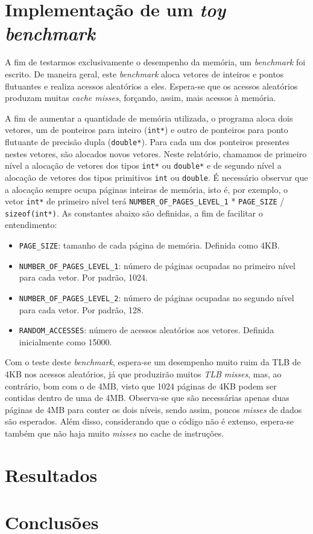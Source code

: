 \documentclass[12pt]{article}
\begin{document}
\section {Implementação de um \textit{toy benchmark}}

A fim de testarmos exclusivamente o desempenho da memória, um \textit{benchmark}
foi escrito.  De maneira geral, este \textit{benchmark} aloca vetores de
inteiros e pontos flutuantes e realiza acessos aleatórios a eles. Espera-se que
os acessos aleatórios produzam muitas \textit{cache misses}, forçando, assim,
mais acessos à memória. 

A fim de aumentar a quantidade de memória utilizada, o programa aloca dois
vetores, um de ponteiros para inteiro (\texttt{int*})
e outro de ponteiros para ponto flutuante de precisão dupla (\texttt{double*}).
Para cada um dos ponteiros presentes nestes vetores, são alocados novos vetores. 
Neste relatório, chamamos de primeiro nível a alocação de vetores dos tipos
\texttt{int*} ou \texttt{double*} e de segundo nível a alocação de vetores dos
tipos primitivos \texttt{int} ou \texttt{double}. É necessário observar que a
alocação sempre ocupa páginas inteiras de memória, isto é, por exemplo, o vetor
\texttt{int*} de primeiro nível terá \texttt{NUMBER\_OF\_PAGES\_LEVEL\_1} *
\texttt{PAGE\_SIZE} / \texttt{sizeof(int*)}. As constantes abaixo são
definidas, a fim de facilitar o entendimento:

\begin {itemize}
\item  \texttt{PAGE\_SIZE}: tamanho de cada página de memória. Definida como
4KB.
\item  \texttt{NUMBER\_OF\_PAGES\_LEVEL\_1}: número de páginas ocupadas no
primeiro nível para cada vetor. Por padrão, 1024.
\item  \texttt{NUMBER\_OF\_PAGES\_LEVEL\_2}: número de páginas ocupadas no
segundo nível para cada vetor. Por padrão, 128.
\item  \texttt{RANDOM\_ACCESSES}: número de acessos aleatórios aos vetores.
Definida inicialmente como 15000.
\end{itemize}

Com o teste deste \textit{benchmark}, espera-se um desempenho muito ruim da
TLB de 4KB nos acessos aleatórios, já que produzirão muitos \textit{TLB misses},
mas, ao contrário, bom com o de 4MB, visto que 1024 páginas de 4KB podem ser
contidas dentro de uma de 4MB. Observa-se que são necessárias apenas duas
páginas de 4MB para conter os dois níveis, sendo assim, poucos \textit{misses}
de dados são esperados. Além disso, considerando que o código não é extenso,
espera-se também que não haja muito \textit{misses} no cache de instruções.

\section {Resultados}

\section {Conclusões}
\end{document}
